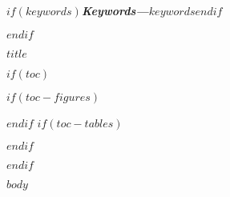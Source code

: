 \documentclass[letterpaper,12pt]{article}
\providecommand{\keywords}[1]{\textbf{\textit{Keywords---}}#1}
\begin{document}
\vspace{\baselineskip}

$if(keywords)$\indent \keywords{$keywords$}$endif$

\newpage

$endif$



\begin{center}
{\large\bfseries $title$}
\end{center}

$if(toc)$
{
\hypersetup{linkcolor=black}
\setcounter{tocdepth}{$toc-depth$}
\tableofcontents
$if(toc-figures)$
\listoffigures
$endif$
$if(toc-tables)$
\listoftables
$endif$
}
$endif$

\doublespacing

$body$

\clearpage
\singlespacing
\printbibliography[heading=bibliography$if(reference-section-title)$, title=$reference-section-title$$endif$]
\end{document}

